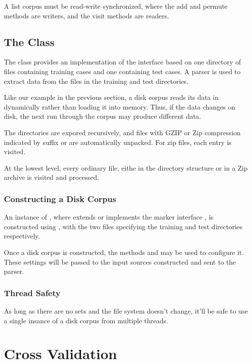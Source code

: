 A list corpus must be read-write synchronized, where the add
and permute methods are writers, and the visit methods are readers.

\subsection{The  Class}

The  class provides an implementation of the
 interface based on one directory of files containing
training cases and one containing test cases.  A parser is used to
extract data from the files in the training and test directories.

Like our example in the previous section, a disk corpus reads its data
in dynamically rather than loading it into memory.  Thus, if the data
changes on disk, the next run through the corpus may produce different
data.  

The directories are expored recursively, and files with GZIP
or Zip compression indicated by suffix  or 
are automatically unpacked.  For zip files, each entry is visited.

At the lowest level, every ordinary file, eithe in the directory
structure or in a Zip archive is visited and processed. 

\subsubsection{Constructing a Disk Corpus}

An instance of , where  extends or
implements the marker interface , is constructed using
, with the two files
specifying the training and test directories respectively.

Once a disk corpus is constructed, the methods
 and  may be
used to configure it.  These settings will be passed to the input
sources constructed and sent to the parser.

\subsubsection{Thread Safety}

As long as there are no sets and the file system doesn't change,
it'll be safe to use a single insance of a disk corpus from
multiple threads.


\section{Cross Validation}

